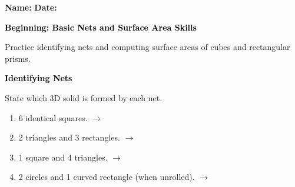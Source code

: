 \documentclass[12pt, letterpaper, fleqn]{article}
\newcommand{\blank}{\underline{\hspace{2.2cm}}}
\begin{document}
\textbf{Name:} \underline{\hspace{5cm}}
\hfill
\textbf{Date:} \underline{\hspace{3cm}}\\

\begin{tcolorbox}[colback=black!10]
    \large\textcolor{black}{\textbf{Beginning: Basic Nets and Surface Area Skills}}
\end{tcolorbox}

\vspace{3mm}

\noindent
Practice identifying nets and computing surface areas of cubes and rectangular prisms.

\vspace{4mm}

\begin{tcolorbox}[colback=black!10]
\large\textcolor{black}{\textbf{Identifying Nets}}
\end{tcolorbox}

\noindent
State which 3D solid is formed by each net.

\vspace{3mm}

\begin{enumerate}[itemsep=2.2cm, leftmargin=0.6cm]

\item 6 identical squares. \quad $\rightarrow$ \quad \blank

\vspace{1.5cm}

\item 2 triangles and 3 rectangles. \quad $\rightarrow$ \quad \blank

\vspace{1.5cm}

\item 1 square and 4 triangles. \quad $\rightarrow$ \quad \blank

\vspace{1.5cm}

\item 2 circles and 1 curved rectangle (when unrolled). \quad $\rightarrow$ \quad \blank

\vspace{1.5cm}

\end{enumerate}
\end{document}
